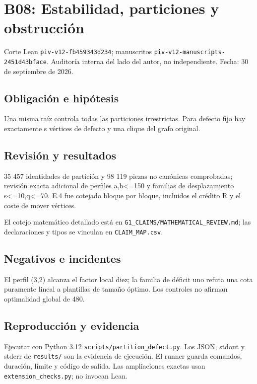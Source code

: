 \documentclass[11pt]{article}
\begin{document}
\section{B08: Estabilidad, particiones y
obstrucción}\label{b08-estabilidad-particiones-y-obstrucciuxf3n}

Corte Lean \nolinkurl{piv-v12-fb459343d234}; manuscritos
\nolinkurl{piv-v12-manuscripts-2451d43bface}. Auditoría interna del lado
del autor, no independiente. Fecha: 30 de septiembre de 2026.

\subsection{Obligación e hipótesis}\label{obligaciuxf3n-e-hipuxf3tesis}

Una misma raíz controla todas las particiones irrestrictas. Para defecto
fijo hay exactamente s vértices de defecto y una clique del grafo
original.

\subsection{Revisión y resultados}\label{revisiuxf3n-y-resultados}

35 457 identidades de partición y 98 119 piezas no canónicas
comprobadas; revisión exacta adicional de perfiles a,b\textless=150 y
familias de desplazamiento s\textless=10,q\textless=70. E.4 fue cotejado
bloque por bloque, incluidos el crédito R y el coste de mover vértices.

El cotejo matemático detallado está en
\nolinkurl{G1_CLAIMS/MATHEMATICAL_REVIEW.md}; las declaraciones y tipos
se vinculan en \nolinkurl{CLAIM_MAP.csv}.

\subsection{Negativos e incidentes}\label{negativos-e-incidentes}

El perfil (3,2) alcanza el factor local diez; la familia de déficit uno
refuta una cota puramente lineal a plantillas de tamaño óptimo. Los
controles no afirman optimalidad global de 480.

\subsection{Reproducción y evidencia}\label{reproducciuxf3n-y-evidencia}

Ejecutar con Python 3.12 \nolinkurl{scripts/partition_defect.py}. Los
JSON, stdout y stderr de \nolinkurl{results/} son la evidencia de
ejecución. El runner guarda comandos, duración, límite y código de
salida. Las ampliaciones exactas usan \nolinkurl{extension_checks.py}; no
invocan Lean.
\end{document}
